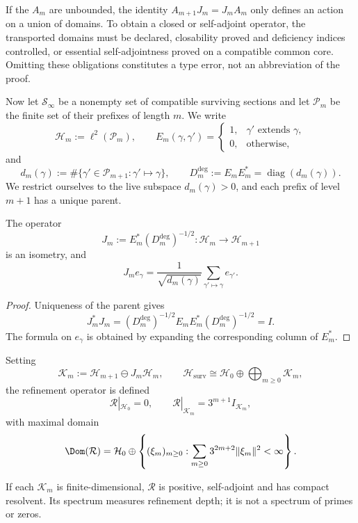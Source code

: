 \begin{remark}
\label{pf84:E03-07}
If the \(A_m\) are unbounded, the identity
\(A_{m+1}J_m=J_mA_m\) only defines an action on a union of domains.
To obtain a closed or self-adjoint operator, the transported domains must be
declared, closability proved and deficiency indices
controlled, or essential self-adjointness proved on a compatible common
core. Omitting these obligations constitutes a type error, not an
abbreviation of the proof.
\end{remark}

Now let \(\mathcal S_\infty\) be a nonempty set of compatible surviving
sections and let \(\mathcal P_m\) be the finite set of their
prefixes of length \(m\). We write
\[
 \mathcal H_m:=\ell^2(\mathcal P_m),
 \qquad
 E_m(\gamma,\gamma')=
 \begin{cases}
 1,&\gamma'\text{ extends }\gamma,\\
 0,&\text{otherwise},
 \end{cases}
\]
and
\[
 d_m(\gamma):=
 \#\{\gamma'\in\mathcal P_{m+1}:\gamma'\mapsto\gamma\},
 \qquad
 D_m^{\deg}:=E_mE_m^*=\operatorname{diag}(d_m(\gamma)).
\]
We restrict ourselves to the live subspace \(d_m(\gamma)>0\), and each prefix of
level \(m+1\) has a unique parent.

\begin{theorem}
\label{pf84:C01}
The operator
\[
 J_m:=E_m^*(D_m^{\deg})^{-1/2}:
 \mathcal H_m\longrightarrow\mathcal H_{m+1}
\]
is an isometry, and
\[
 J_me_\gamma=
 \frac1{\sqrt{d_m(\gamma)}}
 \sum_{\gamma'\mapsto\gamma}e_{\gamma'}.
\]
\end{theorem}

\begin{proof}
Uniqueness of the parent gives
\[
 J_m^*J_m
 =(D_m^{\deg})^{-1/2}E_mE_m^*(D_m^{\deg})^{-1/2}=I.
\]
The formula on \(e_\gamma\) is obtained by expanding the corresponding
column of \(E_m^*\).
\end{proof}

Setting
\[
 \mathcal K_m:=\mathcal H_{m+1}\ominus J_m\mathcal H_m,
 \qquad
 \mathcal H_{\mathrm{surv}}
 \cong\mathcal H_0\oplus\bigoplus_{m\ge0}\mathcal K_m,
\]
the refinement operator is defined
\[
 \mathcal R|_{\mathcal H_0}=0,
 \qquad
 \mathcal R|_{\mathcal K_m}=3^{m+1}I_{\mathcal K_m},
\]
with maximal domain
\[
 \Dom(\mathcal R)=
 \mathcal H_0\oplus
 \left\{(\xi_m)_{m\ge0}:
 \sum_{m\ge0}3^{2m+2}\lVert\xi_m\rVert^2<\infty\right\}.
\]

\begin{theorem}
\label{pf84:C02}
If each \(\mathcal K_m\) is finite-dimensional, \(\mathcal R\) is positive,
self-adjoint and has compact resolvent. Its spectrum measures refinement
depth; it is not a spectrum of primes or zeros.
\end{theorem}

